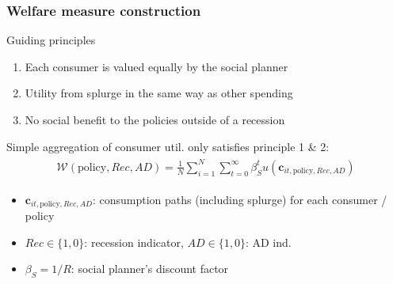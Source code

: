 \documentclass[pdflatex,aspectratio=169]{beamer}
\begin{document}
\begin{frame}
	\frametitle{Welfare measure construction}
	
	Guiding principles
	
	\begin{enumerate}
		\item Each consumer is valued equally by the social planner 
		\item Utility from splurge in the same way as other spending
		\item No social benefit to the policies outside of a recession
	\end{enumerate} 
	
	\vspace{0.6cm}
	\pause
	
	Simple aggregation of consumer util.
only satisfies principle 1 \& 2:
	\begin{equation}\begin{gathered}\begin{aligned}
		\mathcal{W}(\text{policy},Rec,AD) =\frac{1}{N}\sum_{i=1}^{N} \sum_{t=0}^{\infty} \beta_S^t u(\mathbf{c}_{it,\text{policy},Rec,AD}) 
	\end{aligned}\end{gathered}\end{equation}
	
	\begin{itemize}[<+->]
		\item $\mathbf{c}_{it,\text{policy},Rec,AD}$: consumption paths (including splurge) for each consumer / policy
		\item $Rec\in\{1,0\}$: recession indicator, $AD\in\{1,0\}$: AD ind.
		\item $\beta_S = 1/R$: social planner's discount factor 
	\end{itemize}	
	
\end{frame}
\end{document}
